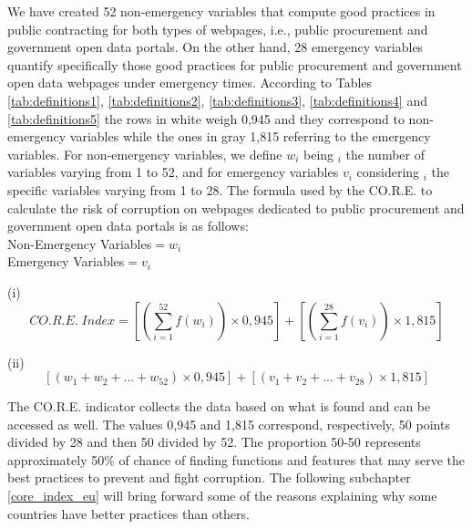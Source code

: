 \documentclass[a4paper, twoside]{report}
\begin{document}
We have created 52 non-emergency variables that compute good practices in public contracting for both types of webpages, i.e., public procurement and government open data portals. On the other hand, 28 emergency variables quantify specifically those good practices for public procurement and government open data webpages under emergency times. According to Tables \ref{tab:definitions1}, \ref{tab:definitions2}, \ref{tab:definitions3}, \ref{tab:definitions4} and \ref{tab:definitions5} the rows in white weigh 0,945 and they correspond to non-emergency variables while the ones in gray 1,815 referring to the emergency variables. For non-emergency variables, we define $w_i$ being $_i$ the number of variables varying from 1 to 52, and for emergency variables $v_i$ considering $_i$ the specific variables varying from 1 to 28.  The formula used by the CO.R.E. to calculate the risk of corruption on webpages dedicated to public procurement and government open data portals is as follows:\\

Non-Emergency Variables$=w_i$\\
Emergency Variables$=v_i$

\begin{center}

(i)\\

   \[ CO.R.E. \; Index = \left[ \left(\sum_{i=1}^{52}f(w_i)\right) \times 0,945 \right]  + \left[ \left(\sum_{i=1}^{28} f(v_i)\right) \times1,815 \right] \]
\end{center}

\begin{center}

(ii)\\

   \[  \left[\left(w_1 + w_2 + ... + w_{52} \right) \times 0,945 \right] + \left[\left(v_1 + v_2 + ... + v_{28} \right) \times1,815 \right] \]
\end{center}

The CO.R.E. indicator collects the data based on what is found and can be accessed as well. The values 0,945 and 1,815 correspond, respectively, 50 points divided by 28 and then 50 divided by 52. The proportion 50-50 represents approximately 50\% of chance of finding functions and features that may serve the best practices to prevent and fight corruption. The following subchapter \ref{core_index_eu} will bring forward some of the reasons explaining why some countries have better practices than others.       
\end{document}
